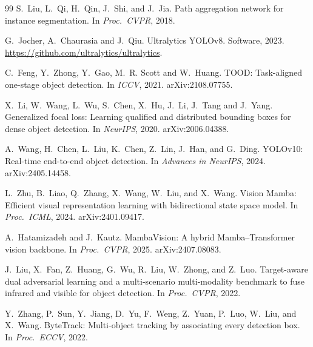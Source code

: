 \begin{thebibliography}{99}
S.~Liu, L.~Qi, H.~Qin, J.~Shi, and J.~Jia.
Path aggregation network for instance segmentation.
In \textit{Proc.\ CVPR}, 2018.

G.~Jocher, A.~Chaurasia and J.~Qiu.
Ultralytics YOLOv8. Software, 2023. \url{https://github.com/ultralytics/ultralytics}.

C.~Feng, Y.~Zhong, Y.~Gao, M.~R. Scott and W.~Huang.
TOOD: Task-aligned one-stage object detection.
In \textit{ICCV}, 2021. arXiv:2108.07755.

X.~Li, W.~Wang, L.~Wu, S.~Chen, X.~Hu, J.~Li, J.~Tang and J.~Yang.
Generalized focal loss: Learning qualified and distributed bounding boxes for dense object detection.
In \textit{NeurIPS}, 2020. arXiv:2006.04388.

A.~Wang, H.~Chen, L.~Liu, K.~Chen, Z.~Lin, J.~Han, and G.~Ding.
YOLOv10: Real-time end-to-end object detection.
In \textit{Advances in NeurIPS}, 2024. arXiv:2405.14458.

L.~Zhu, B.~Liao, Q.~Zhang, X.~Wang, W.~Liu, and X.~Wang.
Vision Mamba: Efficient visual representation learning with bidirectional
state space model. In \textit{Proc.\ ICML}, 2024. arXiv:2401.09417.

A.~Hatamizadeh and J.~Kautz.
MambaVision: A hybrid Mamba--Transformer vision backbone.
In \textit{Proc.\ CVPR}, 2025. arXiv:2407.08083.

J.~Liu, X.~Fan, Z.~Huang, G.~Wu, R.~Liu, W.~Zhong, and Z.~Luo.
Target-aware dual adversarial learning and a multi-scenario multi-modality
benchmark to fuse infrared and visible for object detection.
In \textit{Proc.\ CVPR}, 2022.

Y.~Zhang, P.~Sun, Y.~Jiang, D.~Yu, F.~Weng, Z.~Yuan, P.~Luo, W.~Liu, and X.~Wang.
ByteTrack: Multi-object tracking by associating every detection box.
In \textit{Proc.\ ECCV}, 2022.

\end{thebibliography}
